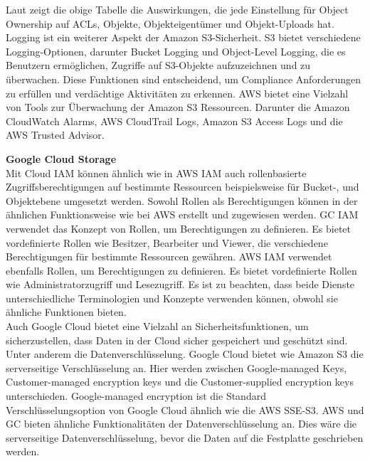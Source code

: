 Laut \citeauthor{aws-iam-s3} zeigt die obige Tabelle die Auswirkungen, die jede Einstellung für Object Ownership auf ACLs, Objekte, Objekteigentümer und Objekt-Uploads hat.\\

Logging ist ein weiterer Aspekt der Amazon S3-Sicherheit. S3 bietet verschiedene Logging-Optionen, darunter Bucket Logging und Object-Level Logging, die es Benutzern ermöglichen, Zugriffe auf S3-Objekte aufzuzeichnen und zu überwachen. Diese Funktionen sind entscheidend, um Compliance Anforderungen zu erfüllen und verdächtige Aktivitäten zu erkennen. AWS bietet eine Vielzahl von Tools zur Überwachung der Amazon S3 Ressourcen. Darunter die Amazon CloudWatch Alarms, AWS CloudTrail Logs, Amazon S3 Access Logs und die AWS Trusted Advisor.\\

\newpage

\textbf{Google Cloud Storage}\\

Mit Cloud IAM können ähnlich wie in AWS IAM auch rollenbasierte Zugriffsberechtigungen auf bestimmte Ressourcen beispielsweise für Bucket-, und Objektebene umgesetzt werden. Sowohl Rollen als Berechtigungen können in der ähnlichen Funktionsweise wie bei AWS erstellt und zugewiesen werden. GC IAM verwendet das Konzept von Rollen, um Berechtigungen zu definieren. Es bietet vordefinierte Rollen wie Besitzer, Bearbeiter und Viewer, die verschiedene Berechtigungen für bestimmte Ressourcen gewähren. AWS IAM verwendet ebenfalls Rollen, um Berechtigungen zu definieren. Es bietet vordefinierte Rollen wie Administratorzugriff und Lesezugriff. Es ist zu beachten, dass beide Dienste unterschiedliche Terminologien und Konzepte verwenden können, obwohl sie ähnliche Funktionen bieten.\\

Auch Google Cloud bietet eine Vielzahl an Sicherheitsfunktionen, um sicherzustellen, dass Daten in der Cloud sicher gespeichert und geschützt sind. Unter anderem die Datenverschlüsselung. Google Cloud bietet wie Amazon S3 die serverseitige Verschlüsselung an. Hier werden zwischen Google-managed Keys, Customer-managed encryption keys und die Customer-supplied encryption keys unterschieden. Google-managed encryption ist die Standard Verschlüsselungsoption von Google Cloud ähnlich wie die AWS SSE-S3. AWS und GC bieten ähnliche Funktionalitäten der Datenverschlüsselung an. Dies wäre die serverseitige Datenverschlüsselung, bevor die Daten auf die Festplatte geschrieben werden. 

